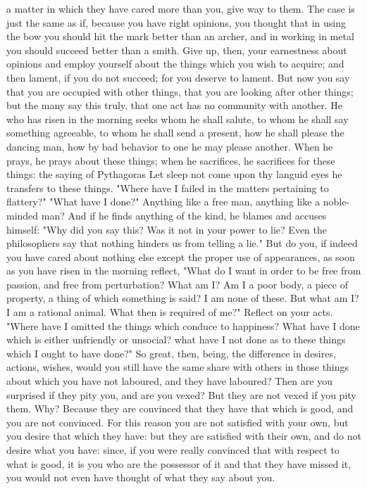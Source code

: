 \documentclass[a4paper]{article}
\begin{document}
a matter in which they have cared more than you, give way to them. The case is
just the same as if, because you have right opinions, you thought that in using
the bow you should hit the mark better than an archer, and in working in metal
you should succeed better than a smith. Give up, then, your earnestness about
opinions and employ yourself about the things which you wish to acquire; and
then lament, if you do not succeed; for you deserve to lament. But now you say
that you are occupied with other things, that you are looking after other
things; but the many say this truly, that one act has no community with
another. He who has risen in the morning seeks whom he shall salute, to whom he
shall say something agreeable, to whom he shall send a present, how he shall
please the dancing man, how by bad behavior to one he may please another. When
he prays, he prays about these things; when he sacrifices, he sacrifices for
these things: the saying of Pythagoras
       Let sleep not come upon thy languid eyes
he transfers to these things. "Where have I failed in the matters pertaining to
flattery?" "What have I done?" Anything like a free man, anything like a
noble-minded man? And if he finds anything of the kind, he blames and accuses
himself: "Why did you say this? Was it not in your power to lie? Even the
philosophers say that nothing hinders us from telling a lie." But do you, if
indeed you have cared about nothing else except the proper use of appearances,
as soon as you have risen in the morning reflect, "What do I want in order to
be free from passion, and free from perturbation? What am I? Am I a poor body,
a piece of property, a thing of which something is said? I am none of these.
But what am I? I am a rational animal. What then is required of me?" Reflect on
your acts. "Where have I omitted the things which conduce to happiness? What
have I done which is either unfriendly or unsocial? what have I not done as to
these things which I ought to have done?"
    So great, then, being, the difference in desires, actions, wishes, would
you still have the same share with others in those things about which you have
not laboured, and they have laboured? Then are you surprised if they pity you,
and are you vexed? But they are not vexed if you pity them. Why? Because they
are convinced that they have that which is good, and you are not convinced. For
this reason you are not satisfied with your own, but you desire that which they
have: but they are satisfied with their own, and do not desire what you have:
since, if you were really convinced that with respect to what is good, it is
you who are the possessor of it and that they have missed it, you would not
even have thought of what they say about you.
\end{document}
